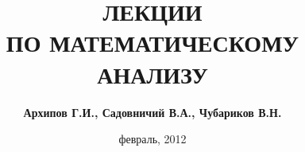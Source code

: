 \documentclass[12pt,titlepage]{report}
\begin{document}
\pagestyle{plain}
\title{\textbf{ЛЕКЦИИ \\ПО МАТЕМАТИЧЕСКОМУ \\АНАЛИЗУ}}
\author{\textbf{Архипов Г.И., Садовничий В.А., Чубариков В.Н.}}
\date{февраль, 2012}

\tableofcontents
\end{document}
